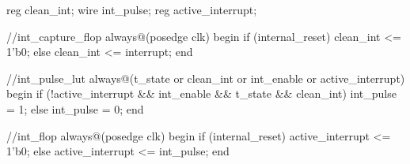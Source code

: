\begin{vcode}
reg clean_int;
wire int_pulse;
reg active_interrupt;

//int_capture_flop
always@(posedge clk)
begin
    if (internal_reset)
        clean_int <= 1'b0;
    else
        clean_int <= interrupt;
end

//int_pulse_lut
always@(t_state or clean_int or int_enable or active_interrupt)
begin
    if (!active_interrupt && int_enable && t_state && clean_int)
        int_pulse = 1;
    else
        int_pulse = 0;
end

//int_flop
always@(posedge clk)
begin
    if (internal_reset)
        active_interrupt <= 1'b0;
    else
        active_interrupt <= int_pulse;
end
\end{vcode}

